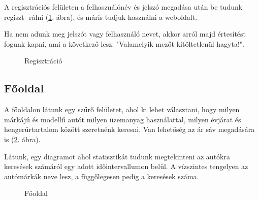 A regisztrációs felületen a felhasználónév és jelszó megadása után be tudunk regiszt-
rálni (\ref{fig:Regisztráció}. ábra), és máris tudjuk használni a weboldalt.

Ha nem adunk meg jelszót vagy felhasználó nevet, akkor arról majd értesítést fogunk kapni, ami a következő lesz: "Valamelyik mezőt kitöltetlenül hagyta!".

\begin{figure}[h]
\centering
{}
\caption{Regisztráció}
\label{fig:Regisztráció}
\end{figure}

\newpage
\subsection{Főoldal}

A főoldalon látunk egy szűrő felületet, ahol ki lehet választani, hogy milyen márkájú és modellű autót milyen üzemanyag használattal, milyen évjárat és hengerűrtartalom között szeretnénk keresni. Van lehetőség az ár sáv megadására is (\ref{fig:Fooldal}. ábra).

Látunk, egy diagramot ahol statisztikát tudunk megtekinteni az autókra keresések számáról egy adott időintervallumon belül. A vízszintes tengelyen az autómárkák neve lesz, a függőlegesen pedig a keresések száma.

\begin{figure}[h]
\centering
{}
\caption{Főoldal}
\label{fig:Fooldal}
\end{figure}

